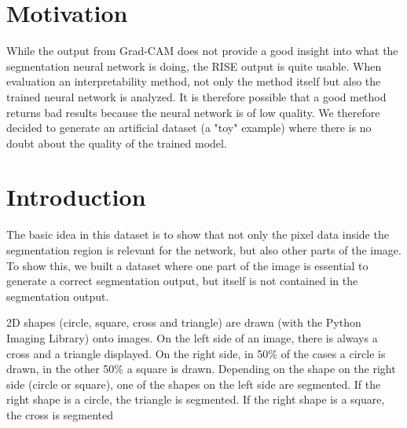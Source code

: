 \section{Motivation}
While the output from Grad-CAM does not provide a good insight into what the segmentation neural network is doing, the RISE output is quite usable. When evaluation an interpretability method, not only the method itself but also the trained neural network is analyzed. It is therefore possible that a good method returns bad results because the neural network is of low quality. We therefore decided to generate an artificial dataset (a "toy" example) where there is no doubt about the quality of the trained model.


\section{Introduction}

The basic idea in this dataset is to show that not only the pixel data inside the segmentation region is relevant for the network, but also other parts of the image. To show this, we built a dataset where one part of the image is essential to generate a correct segmentation output, but itself is not contained in the segmentation output.

2D shapes (circle, square, cross and triangle) are drawn (with the Python Imaging Library) onto images. On the left side of an image, there is always a cross and a triangle displayed. On the right side, in 50\% of the cases a circle is drawn, in the other 50\% a square is drawn. Depending on the shape on the right side (circle or square), one of the shapes on the left side are segmented. If the right shape is a circle, the triangle is segmented. If the right shape is a square, the cross is segmented


